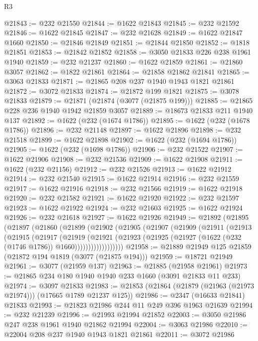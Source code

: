 \begin{lexlean}{R3}
\begin{coremodule}
@21843 := @232 @21550
@21844 := @1622 @21843
@21845 := @232 @21592
@21846 := @1622 @21845
@21847 := @232 @21628
@21849 := @1622 @21847 @1660
@21850 := @21846 @21849
@21851 := @21844 @21850
@21852 := @1818 @21851
@21853 := @21842 @21852
@21858 := @3050 @21833 @226 @238 @1961 @1940
@21859 := @232 @21237
@21860 := @1622 @21859
@21861 := @21860 @3057
@21862 := @1822 @21861
@21864 := @21858 @21862 @21841
@21865 := @3063 @21833
@21871 := @21865 @208 @237 @1940 @1943 @1821 @21861
@21872 := @3072 @21833
@21874 := @21872 @199 @1821
@21875 := @3078 @21833
@21879 := @21871 (@21874 (@3077 (@21875 @199)))
@21885 := @21865 @228 @236 @1940 @1942 @21859 @3057
@21889 := @18673 @21833 @211 @1940 @137
@21892 := @1622 (@232 (@1674 @1786))
@21895 := @1622 (@232 (@1678 @1786))
@21896 := @232 @21148
@21897 := @1622 @21896
@21898 := @232 @21518
@21899 := @1622 @21898
@21902 := @1622 (@232 (@1694 @1786))
@21905 := @1622 (@232 (@1698 @1786))
@21906 := @232 @21522
@21907 := @1622 @21906
@21908 := @232 @21536
@21909 := @1622 @21908
@21911 := @1622 (@232 @21156)
@21912 := @232 @21526
@21913 := @1622 @21912
@21914 := @232 @21540
@21915 := @1622 @21914
@21916 := @232 @21559
@21917 := @1622 @21916
@21918 := @232 @21566
@21919 := @1622 @21918
@21920 := @232 @21582
@21921 := @1622 @21920
@21922 := @232 @21597
@21923 := @1622 @21922
@21924 := @232 @21603
@21925 := @1622 @21924
@21926 := @232 @21618
@21927 := @1622 @21926
@21949 := @21892
    (@21895
      (@21897
        (@21860
          (@21899
            (@21902
              (@21905
                (@21907
                  (@21909
                    (@21911
                      (@21913
                        (@21915
                          (@21917
                            (@21919
                              (@21921
                                (@21923
                                  (@21925
                                    (@21927 (@1622 (@232 (@1746 @1786)) @1660))))))))))))))))))
@21958 := @21889 @21949 @125 @21859 (@21872 @194 @1819 (@3077 (@21875 @194)))
@21959 := @18721 @21949
@21961 := @3077 (@21959 @137)
@21963 := @21885 (@21958 @21961)
@21973 := @21865 @234 @180 @1940 @1940 @233 @1660 (@3091 @21833 @11 @233)
@21974 := @3097 @21833
@21983 := @21853 (@21864 (@21879 (@21963 (@21973 @21974))) (@17665 @1789 @21237 @125))
@21986 := @2347 (@16633 @21841) @21833
@21993 := @21823 @21986 @244 @11 @249 @396 @1963 @21639
@21994 := @232 @21239
@21996 := @21993 @21994 @21852
@22003 := @3050 @21986 @247 @238 @1961 @1940 @21862 @21994
@22004 := @3063 @21986
@22010 := @22004 @208 @237 @1940 @1943 @1821 @21861
@22011 := @3072 @21986

\end{coremodule}
\end{lexlean}
